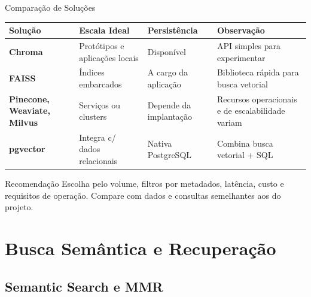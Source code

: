 \documentclass[aspectratio=169]{beamer}
\begin{document}
\begin{frame}[shrink=5]{Comparação de Soluções}
    \begin{center}\footnotesize
    \begin{tabular}{>{\bfseries}p{2.0cm}p{3.0cm}p{2.8cm}p{3.4cm}}
    \toprule
    Solução & Escala Ideal & Persistência & Observação \\
    \midrule
    Chroma & Protótipos e aplicações locais & Disponível & API simples para experimentar \\
    FAISS & Índices embarcados & A cargo da aplicação & Biblioteca rápida para busca vetorial \\
    Pinecone, Weaviate, Milvus & Serviços ou clusters & Depende da implantação & Recursos operacionais e de escalabilidade variam \\
    pgvector & Integra c/ dados relacionais & Nativa PostgreSQL & Combina busca vetorial + SQL \\
    \bottomrule
    \end{tabular}
    \end{center}
    \pause
    \begin{alertblock}{Recomendação}
        \footnotesize Escolha pelo volume, filtros por metadados, latência, custo e requisitos de operação. Compare com dados e consultas semelhantes aos do projeto.
    \end{alertblock}
\end{frame}

\section{Busca Semântica e Recuperação}

\subsection{Semantic Search e MMR}
\end{document}
